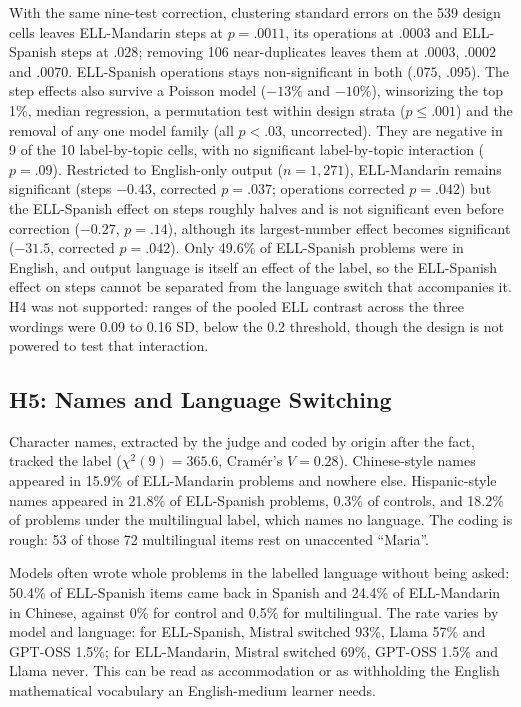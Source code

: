 \documentclass[runningheads,a4paper]{llncs}
\begin{document}
With the same nine-test correction, clustering standard errors on the 539 design cells leaves ELL-Mandarin steps at $p=.0011$, its operations at $.0003$ and ELL-Spanish steps at $.028$; removing 106 near-duplicates leaves them at $.0003$, $.0002$ and $.0070$. ELL-Spanish operations stays non-significant in both ($.075$, $.095$). The step effects also survive a Poisson model ($-13\%$ and $-10\%$), winsorizing the top 1\%, median regression, a permutation test within design strata ($p\leq.001$) and the removal of any one model family (all $p<.03$, uncorrected). They are negative in 9 of the 10 label-by-topic cells, with no significant label-by-topic interaction ($p=.09$). Restricted to English-only output ($n=1{,}271$), ELL-Mandarin remains significant (steps $-0.43$, corrected $p=.037$; operations corrected $p=.042$) but the ELL-Spanish effect on steps roughly halves and is not significant even before correction ($-0.27$, $p=.14$), although its largest-number effect becomes significant ($-31.5$, corrected $p=.042$). Only 49.6\% of ELL-Spanish problems were in English, and output language is itself an effect of the label, so the ELL-Spanish effect on steps cannot be separated from the language switch that accompanies it. H4 was not supported: ranges of the pooled ELL contrast across the three wordings were 0.09 to 0.16 SD, below the 0.2 threshold, though the design is not powered to test that interaction.

\subsection{H5: Names and Language Switching}\label{sec:h5}

Character names, extracted by the judge and coded by origin after the fact, tracked the label ($\chi^2(9)=365.6$, Cram\'er's $V=0.28$). Chinese-style names appeared in 15.9\% of ELL-Mandarin problems and nowhere else. Hispanic-style names appeared in 21.8\% of ELL-Spanish problems, 0.3\% of controls, and 18.2\% of problems under the multilingual label, which names no language. The coding is rough: 53 of those 72 multilingual items rest on unaccented ``Maria''.

Models often wrote whole problems in the labelled language without being asked: 50.4\% of ELL-Spanish items came back in Spanish and 24.4\% of ELL-Mandarin in Chinese, against 0\% for control and 0.5\% for multilingual. The rate varies by model and language: for ELL-Spanish, Mistral switched 93\%, Llama 57\% and GPT-OSS 1.5\%; for ELL-Mandarin, Mistral switched 69\%, GPT-OSS 1.5\% and Llama never. This can be read as accommodation or as withholding the English mathematical vocabulary an English-medium learner needs.
\end{document}
